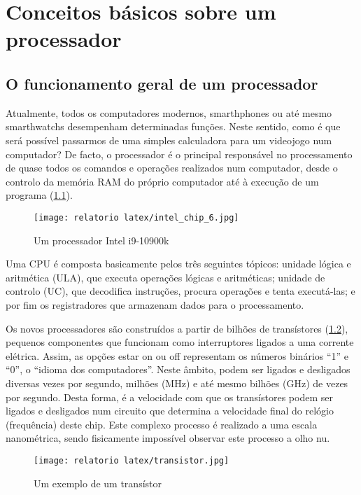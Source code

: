 \documentclass{report}
\begin{document}
\chapter{Conceitos básicos sobre um processador}
\label{chap.Conceitos básicos sobre um processador}
\section{O funcionamento geral de um processador}
Atualmente, todos os computadores modernos, smarthphones ou até mesmo smarthwatchs desempenham determinadas funções. Neste sentido, como é que será possível passarmos de uma simples calculadora para um videojogo num computador? De facto, o processador é o principal responsável no processamento de quase todos os comandos e operações realizados num computador, desde o controlo da memória \ac{RAM} do próprio computador até à execução de um programa \cite{Funcionamento1} (\ref{fig:Intel I9}).

\begin{figure}[h!]
\centering
  \texttt{[image: relatorio latex/intel\_chip\_6.jpg]}
  \caption{Um processador \ac{Intel} i9-10900k}
  \label{fig:Intel I9}
\end{figure}

Uma \ac{CPU} é composta basicamente pelos três seguintes tópicos: unidade lógica e aritmética (ULA), que executa operações lógicas e aritméticas; unidade de controlo (UC), que decodifica instruções, procura operações e tenta executá-las; e por fim os registradores que armazenam dados para o processamento\cite{Funcionamento5}.

Os novos processadores são construídos a partir de bilhões de transístores (\ref{fig:transístor1}), pequenos componentes que funcionam como interruptores ligados a uma corrente elétrica. Assim, as opções estar on ou off representam os números binários “1” e “0”, o “idioma dos computadores”. Neste âmbito, podem ser ligados e desligados diversas vezes por segundo, milhões (MHz) e até mesmo bilhões (GHz) de vezes por segundo. Desta forma, é a velocidade com que os transístores podem ser ligados e desligados num circuito que determina a velocidade final do relógio (frequência) deste chip. Este complexo processo é realizado a uma escala nanométrica, sendo fisicamente impossível observar este processo a olho nu\cite{Funcionamento4}.

\begin{figure}[h!]
\centering
  \texttt{[image: relatorio latex/transistor.jpg]}
  \caption{Um exemplo de um transístor}
  \label{fig:transístor1}
\end{figure}
\end{document}
